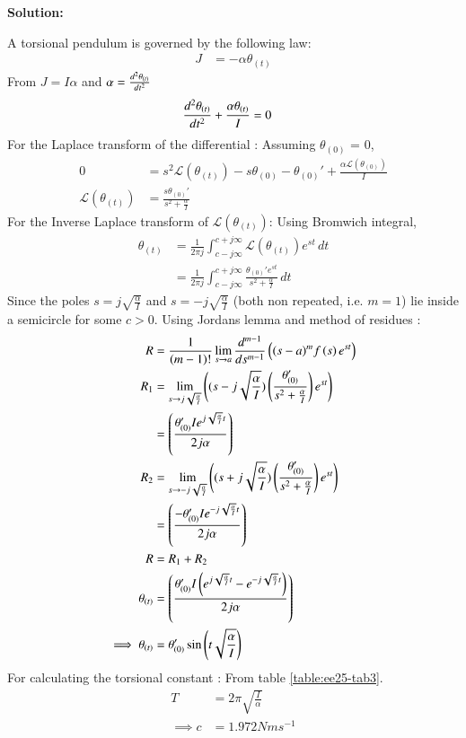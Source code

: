 \documentclass[journal,12pt,onecolumn]{IEEEtran}
\theoremstyle{remark}
\begin{document}
\textbf{Solution:}
    
A torsional pendulum is governed by the following law:
\begin{align}
    J &= -\alpha\theta_{(t)} 
\end{align}
From $J = I\alpha$ and $\alpha = \dv[2]{\theta_{(t)}}{t}$
\begin{align}
\dv[2]{\theta_{(t)}}{t} + \frac{\alpha\theta_{(t)}}{I} &= 0
\end{align}
For the Laplace transform of the differential : 
Assuming $\theta_{(0)}$ = 0,
\begin{align}
0 &= s^2\mathscr{L}(\theta_{(t)}) - s\theta_{(0)} - \theta_{(0)}' + \frac{\alpha\mathscr{L}(\theta_{(0)})}{I}\\
\mathscr{L}(\theta_{(t)}) &= \frac{s\theta_{(0)}'}{s^2+\frac{\alpha}{I}}
    \end{align}
For the Inverse Laplace transform of $\mathscr{L}(\theta_{(t)})$: Using Bromwich integral,
\begin{align}
 \theta_{(t)} &= \frac{1}{2\pi j}\int_{c-j\infty}^{c+j\infty}\mathscr{L}(\theta_{(t)})e^{st}\,dt\\
 &= \frac{1}{2\pi j}\int_{c-j\infty}^{c+j\infty}\frac{\theta_{(0)}'e^{st}}{s^2+\frac{\alpha}{I}}\,dt
\end{align}
Since the poles $s=j\sqrt{\frac{\alpha}{I}}$ and $s=-j\sqrt{\frac{\alpha}{I}}$ (both non repeated, i.e. $m=1$) lie inside a semicircle for some $c>0$. Using Jordans lemma and method of residues :
\begin{align}
    R&=\frac{1}{\left(m-1\right)!}\lim\limits_{s\to a}\frac{d^{m-1}}{ds^{m-1}}\left({(s-a)}^{m}f\left(s\right) e^{st}\right)\\
      R_1&=\lim\limits_{s\to j\sqrt{\frac{\alpha}{I}}}\left({(s-j\sqrt{\frac{\alpha}{I}})}\left(\frac{\theta_{(0)}'}{s^2+\frac{\alpha}{I}}\right) e^{st}\right)\\
&={\left(\frac{\theta_{(0)}'Ie^{j\sqrt{\frac{\alpha}{I}}t}}{2j\alpha}\right)}\\
  R_2&=\lim\limits_{s\to -j\sqrt{\frac{\alpha}{I}}}\left({(s+j\sqrt{\frac{\alpha}{I}})}\left(\frac{\theta_{(0)}'}{s^2+\frac{\alpha}{I}}\right) e^{st}\right)\\
&={\left(\frac{-\theta_{(0)}'Ie^{-j\sqrt{\frac{\alpha}{I}}t}}{2j\alpha}\right)}\\
R &= R_1 + R_2\\
\theta_{(t)} &= {\left(\frac{\theta_{(0)}'I\left(e^{j\sqrt{\frac{\alpha}{I}}t}-e^{-j\sqrt{\frac{\alpha}{I}}t}\right)}{2j\alpha}\right)}\\
\implies
\theta_{(t)} &=\theta_{(0)}'\sin{\ensuremath{\left(t\sqrt{\frac{\alpha}{I}}\right)}}
\end{align}
For calculating the torsional constant :
From table \ref{table:ee25-tab3}.
\begin{align}
 T &= 2\pi\sqrt{\frac{I}{\alpha}}\\
\implies c &= 1.972 Nms^{-1}
\end{align}
\end{document}
